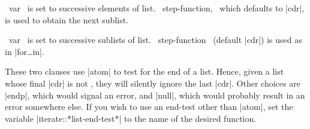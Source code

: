 \begin{clauses}

~var~ is set to successive elements of list.  
~step-function,~ which 
defaults to |cdr|, is used to obtain the next sublist. 

~var~ is set to successive sublists of list. 
~step-function~ (default |cdr|) is used as in |for\dots in|.

\end{clauses}

\medskip

These two clauses use |atom| to test for the end
of a list.  Hence, given a list whose final |cdr| is not \nil,
they will silently ignore the last |cdr|.  Other choices are
|endp|,  which would signal an error, and |null|, which
would probably result in an error somewhere else.  If you wish to use
an end-test other than |atom|, set the variable
|iterate::*list-end-test*| to the name of
the desired function. 

